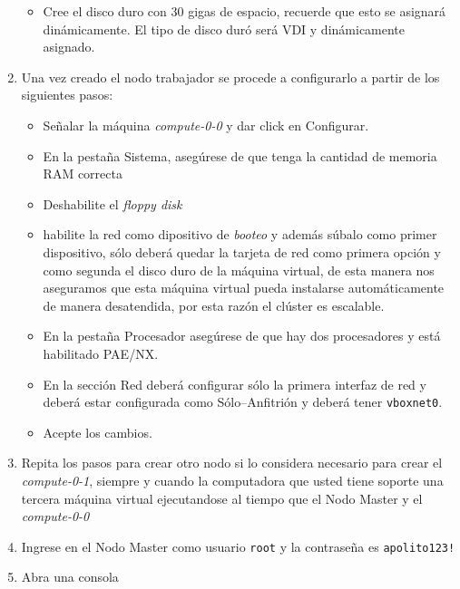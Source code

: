 \begin{enumerate}
\begin{itemize}
	\item Cree el disco duro con 30 gigas de espacio, recuerde que esto se asignará dinámicamente. El tipo de disco duró será VDI y dinámicamente asignado.

\end{itemize}

\item Una vez creado el nodo trabajador se procede a configurarlo a partir de los siguientes pasos:

\begin{itemize}
	\item Señalar la máquina \textit{compute-0-0} y dar click en Configurar.

	\item En la pestaña Sistema, asegúrese de que tenga la cantidad de memoria RAM correcta

	\item Deshabilite el \textit{floppy disk}

	\item habilite la red como dipositivo de \textit{booteo} y además súbalo como primer dispositivo, sólo deberá quedar la tarjeta de red como primera opción y como segunda el disco duro de la máquina virtual, de esta manera nos aseguramos que esta máquina virtual pueda instalarse automáticamente de manera desatendida, por esta razón el clúster es escalable. 

	\item En la pestaña Procesador asegúrese de que hay dos procesadores y está habilitado PAE/NX.

	\item En la sección Red deberá configurar sólo la primera interfaz de red y deberá estar configurada como Sólo--Anfitrión y deberá tener \texttt{vboxnet0}.

	\item Acepte los cambios.
\end{itemize}


\item Repita los pasos para crear otro nodo si lo considera necesario para crear el \textit{compute-0-1}, siempre y cuando la computadora que usted tiene soporte una tercera máquina virtual ejecutandose al tiempo que el Nodo Master y el \textit{compute-0-0}

\item Ingrese en el Nodo Master como usuario \texttt{root} y la contraseña es \texttt{apolito123!}

\item Abra una consola


\end{enumerate}
